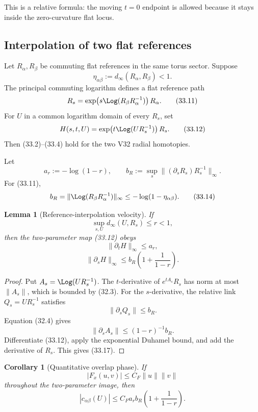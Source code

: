 \documentclass[11pt]{article}
\newtheorem{lemma}[theorem]{Lemma}
\newtheorem{corollary}[theorem]{Corollary}
\begin{document}
This is a relative formula: the moving \(t=0\) endpoint is allowed
because it stays inside the zero-curvature flat locus.

\subsection{Interpolation of two flat references}

Let \(R_\alpha,R_\beta\) be commuting flat references in the same
torus sector.  Suppose
\[
 \eta_{\alpha\beta}
 :=
 d_\infty(R_\alpha,R_\beta)<1.
 \tag{33.10}
\]
The principal commuting logarithm defines a flat reference path
\[
 R_s=
 \exp\!\left(
 s\Log(R_\beta R_\alpha^{-1})
 \right)R_\alpha.
 \tag{33.11}
\]
For \(U\) in a common logarithm domain of every \(R_s\), set
\[
 H(s,t,U)
 =
 \exp\!\left(
 t\Log(UR_s^{-1})
 \right)R_s.
 \tag{33.12}
\]
Then (33.2)--(33.4) hold for the two V32 radial homotopies.

Let
\[
 a_r:=-\log(1-r),
 \qquad
 b_R:=
 \sup_s\|(\partial_sR_s)R_s^{-1}\|_\infty.
 \tag{33.13}
\]
For (33.11),
\[
 b_R
 =
 \|\Log(R_\beta R_\alpha^{-1})\|_\infty
 \leq-\log(1-\eta_{\alpha\beta}).
 \tag{33.14}
\]

\begin{lemma}[Reference-interpolation velocity]
\label{lem:v11v33-reference-velocity}
If
\[
 \sup_{s,U}d_\infty(U,R_s)\leq r<1,
 \tag{33.15}
\]
then the two-parameter map (33.12) obeys
\[
 \|\partial_tH\|_\infty\leq a_r,
 \tag{33.16}
\]
\[
 \|\partial_sH\|_\infty
 \leq
 b_R\left(1+\frac1{1-r}\right).
 \tag{33.17}
\]
\end{lemma}

\begin{proof}
Put \(A_s=\Log(UR_s^{-1})\).  The \(t\)-derivative of
\(e^{tA_s}R_s\) has norm at most \(\|A_s\|\), which is bounded by
(32.3).  For the \(s\)-derivative, the relative link
\(Q_s=UR_s^{-1}\) satisfies
\[
 \|\partial_sQ_s\|
 \leq b_R.
\]
Equation (32.4) gives
\[
 \|\partial_sA_s\|
 \leq(1-r)^{-1}b_R.
\]
Differentiate (33.12), apply the exponential Duhamel bound, and add the
derivative of \(R_s\).  This gives (33.17).
\end{proof}

\begin{corollary}[Quantitative overlap phase]
\label{cor:v11v33-overlap-bound}
If
\[
 |F_x(u,v)|\leq C_F\|u\|\|v\|
 \tag{33.18}
\]
throughout the two-parameter image, then
\[
 |c_{\alpha\beta}(U)|
 \leq
 C_Fa_rb_R\left(1+\frac1{1-r}\right).
 \tag{33.19}
\]
\end{corollary}
\end{document}
